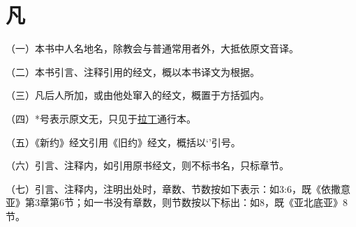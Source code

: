 \chapter*{凡}


（一）本书中人名地名，除教会与普通常用者外，大抵依原文音译。

（二）本书引言、注释引用的经文，概以本书译文为根据。

（三）凡后人所加，或由他处窜入的经文，概置于方括弧内。

（四）*号表示原文无，只见于\uline{拉丁}通行本。

（五）《新约》经文引用《旧约》经文，概括以‘’引号。

（六）引言、注释内，如引用原书经文，则不标书名，只标章节。

（七）引言、注释内，注明出处时，章数、节数按如下表示：如3:6，既《依撒意亚》第3章第6节；如一书没有章数，则节数按以下标出：如8，既《亚北底亚》8节。

